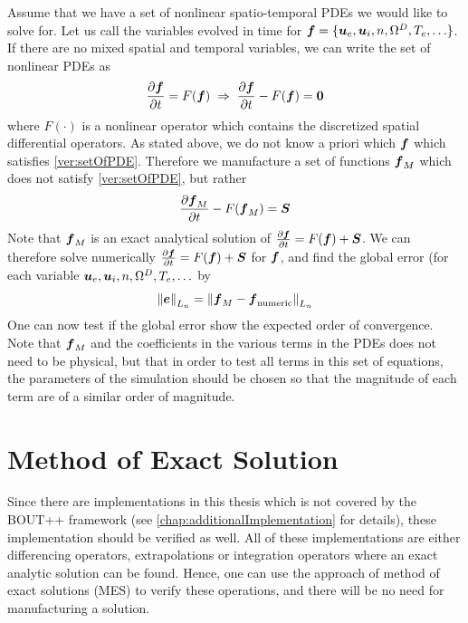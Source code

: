 Assume that we have a set of nonlinear spatio-temporal PDEs we would like to solve for.
Let us call the variables evolved in time for $\boldsymbol{f}=\{\boldsymbol{u}_e, \boldsymbol{u}_i, n, \Omega^D, T_e, \ldots\}$.
If there are no mixed spatial and temporal variables, we can write the set of nonlinear PDEs as
%
\begin{align}
  \frac{\partial {\boldsymbol{f}}}{\partial{t}} = F(\boldsymbol{f}) \; \Rightarrow \; \frac{\partial {\boldsymbol{f}}}{\partial{t}} - F(\boldsymbol{f}) = \boldsymbol{0}
  \label{ver:setOfPDE}
\end{align}
%
where $F(\cdot)$ is a nonlinear operator which contains the discretized spatial differential operators.
As stated above, we do not know a priori which $\boldsymbol{f}$ which satisfies \cref{ver:setOfPDE}.
Therefore we manufacture a set of functions $\boldsymbol{f}_M$ which does not satisfy \cref{ver:setOfPDE}, but rather
%
\begin{align*}
    \frac{\partial {\boldsymbol{f}_M}}{\partial{t}} - F(\boldsymbol{f}_M) = \boldsymbol{S}
\end{align*}
%
Note that $\boldsymbol{f}_M$ is an exact analytical solution of $\frac{\partial {\boldsymbol{f}}}{\partial{t}} = F(\boldsymbol{f}) + \boldsymbol{S}$.
We can therefore solve numerically $\frac{\partial {\boldsymbol{f}}}{\partial{t}} = F(\boldsymbol{f}) + \boldsymbol{S}$ for $\boldsymbol{f}$, and find the global error (for each variable $\boldsymbol{u}_e, \boldsymbol{u}_i, n, \Omega^D, T_e, \ldots$ by
%
\begin{align*}
    \left\|\boldsymbol{e}\right\|_{L_n} =
    \left\|\boldsymbol{f}_{M} - \boldsymbol{f}_{\text{numeric}}\right\|_{L_n}
\end{align*}
%
One can now test if the global error show the expected order of convergence.
Note that $\boldsymbol{f}_M$ and the coefficients in the various terms in the PDEs does not need to be physical, but that in order to test all terms in this set of equations, the parameters of the simulation should be chosen so that the magnitude of each term are of a similar order of magnitude.

\section{Method of Exact Solution}
\label{sec:MES}
%

Since there are implementations in this thesis which is not covered by the BOUT++ framework (see \cref{chap:additionalImplementation} for details), these implementation should be verified as well.
All of these implementations are either differencing operators, extrapolations or integration operators where an exact analytic solution can be found.
Hence, one can use the approach of method of exact solutions (MES) to verify these operations, and there will be no need for manufacturing a solution.

